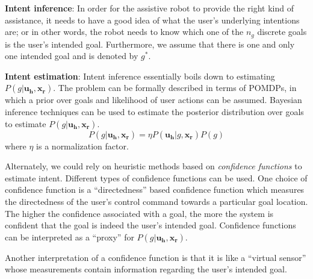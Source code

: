 \documentclass[]{article}
\begin{document}
\noindent \textbf{Intent inference}: In order for the assistive robot to provide the right kind of assistance, it needs to have a good idea of what the user's underlying intentions are; or in other words, the robot needs to know which one of the $n_g$ discrete goals is the user's intended goal. Furthermore, we assume that there is one and only one intended goal and is denoted by $g^*$.
%
%

\noindent \textbf{Intent estimation}: Intent inference essentially boils down to estimating $P(g|\boldsymbol{u_h}, \boldsymbol{x_r})$. The problem can be formally described in terms of POMDPs, in which a prior over goals and likelihood of user actions can be assumed. Bayesian inference techniques can be used to estimate the posterior distribution over goals to estimate $P(g|\boldsymbol{u_h}, \boldsymbol{x_r})$. 
\begin{equation*}
P(g|\boldsymbol{u_h}, \boldsymbol{x_r}) = \eta P(\boldsymbol{u_h} | g, \boldsymbol{x_r})P(g)
\end{equation*}
where $\eta$ is a normalization factor. 

Alternately, we could rely on heuristic methods based on \textit{confidence functions} to estimate intent. Different types of confidence functions can be used. One choice of confidence function is a ``directedness'' based confidence function which measures the directedness of the user's control command towards a particular goal location. The higher the confidence associated with a goal, the more the system is confident that the goal is indeed the user's intended goal. 
Confidence functions can be interpreted as a ``proxy'' for $P(g|\boldsymbol{u_h}, \boldsymbol{x_r})$. 

Another interpretation of a confidence function is that it is like a ``virtual sensor'' whose measurements contain information regarding the user's intended goal.
\end{document}
